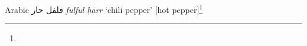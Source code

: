 \begin{etymology}\label{ety:fulful harr}
Arabic {فلفل حار } \textit{fulful ḥārr} `chili pepper' [hot pepper]\footnote{}
\end{etymology}